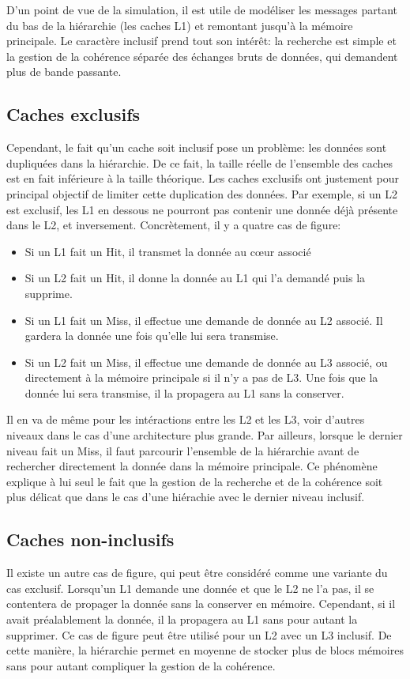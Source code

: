\documentclass[a4paper]{article}
\begin{document}
\indent D'un point de vue de la simulation, il est utile de modéliser les messages partant du bas de la hiérarchie (les caches L1) et remontant jusqu'à la mémoire principale. Le caractère inclusif prend tout son intérêt: la recherche est simple et la gestion de la cohérence séparée des échanges bruts de données, qui demandent plus de bande passante.

\newpage
\subsection{Caches exclusifs}
\indent Cependant, le fait qu'un cache soit inclusif pose un problème: les données sont dupliquées dans la hiérarchie. De ce fait, la taille réelle de l'ensemble des caches est en fait inférieure à la taille théorique. Les caches exclusifs ont justement pour principal objectif de limiter cette duplication des données. Par exemple, si un L2 est exclusif, les L1 en dessous ne pourront pas contenir une donnée déjà présente dans le L2, et inversement. Concrètement, il y a quatre cas de figure: \\

\begin{itemize}
\item Si un L1 fait un Hit, il transmet la donnée au c{\oe}ur associé
\item Si un L2 fait un Hit, il donne la donnée au L1 qui l'a demandé puis la supprime.
\item Si un L1 fait un Miss, il effectue une demande de donnée au L2 associé. Il gardera la donnée une fois qu'elle lui sera transmise.
\item Si un L2 fait un Miss, il effectue une demande de donnée au L3 associé, ou directement à la mémoire principale si il n'y a pas de L3. Une fois que la donnée lui sera transmise, il la propagera au L1 sans la conserver. \\
\end{itemize}

\indent Il en va de même pour les intéractions entre les L2 et les L3, voir d'autres niveaux dans le cas d'une architecture plus grande. Par ailleurs, lorsque le dernier niveau fait un Miss, il faut parcourir l'ensemble de la hiérarchie avant de rechercher directement la donnée dans la mémoire principale. Ce phénomène explique à lui seul le fait que la gestion de la recherche et de la cohérence soit plus délicat que dans le cas d'une hiérachie avec le dernier niveau inclusif.

\subsection{Caches non-inclusifs}
\indent Il existe un autre cas de figure, qui peut être considéré comme une variante du cas exclusif. Lorsqu'un L1 demande une donnée et que le L2 ne l'a pas, il se contentera de propager la donnée sans la conserver en mémoire. Cependant, si il avait préalablement la donnée, il la propagera au L1 sans pour autant la supprimer. Ce cas de figure peut être utilisé pour un L2 avec un L3 inclusif. De cette manière, la hiérarchie permet en moyenne de stocker plus de blocs mémoires sans pour autant compliquer la gestion de la cohérence. \\
\end{document}
